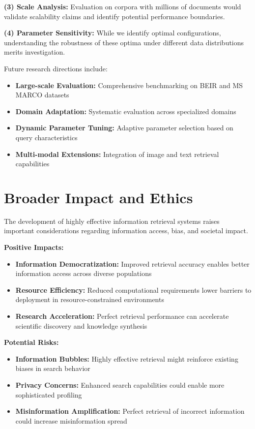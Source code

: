 \documentclass{neurips_2025}
\begin{document}
\textbf{(3) Scale Analysis:} Evaluation on corpora with millions of documents would validate scalability claims and identify potential performance boundaries.

\textbf{(4) Parameter Sensitivity:} While we identify optimal configurations, understanding the robustness of these optima under different data distributions merits investigation.

Future research directions include:
\begin{itemize}
\item \textbf{Large-scale Evaluation:} Comprehensive benchmarking on BEIR and MS MARCO datasets
\item \textbf{Domain Adaptation:} Systematic evaluation across specialized domains  
\item \textbf{Dynamic Parameter Tuning:} Adaptive parameter selection based on query characteristics
\item \textbf{Multi-modal Extensions:} Integration of image and text retrieval capabilities
\end{itemize}

\section{Broader Impact and Ethics}

The development of highly effective information retrieval systems raises important considerations regarding information access, bias, and societal impact.

\textbf{Positive Impacts:}
\begin{itemize}
\item \textbf{Information Democratization:} Improved retrieval accuracy enables better information access across diverse populations
\item \textbf{Resource Efficiency:} Reduced computational requirements lower barriers to deployment in resource-constrained environments
\item \textbf{Research Acceleration:} Perfect retrieval performance can accelerate scientific discovery and knowledge synthesis
\end{itemize}

\textbf{Potential Risks:}
\begin{itemize}
\item \textbf{Information Bubbles:} Highly effective retrieval might reinforce existing biases in search behavior
\item \textbf{Privacy Concerns:} Enhanced search capabilities could enable more sophisticated profiling
\item \textbf{Misinformation Amplification:} Perfect retrieval of incorrect information could increase misinformation spread
\end{itemize}
\end{document}
